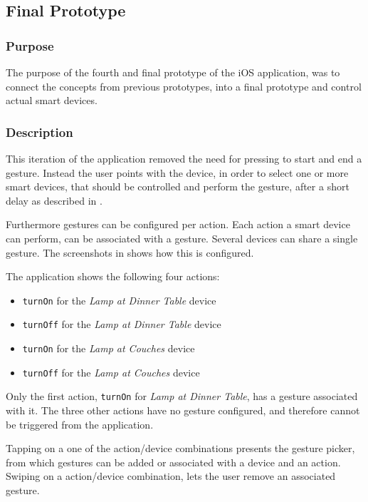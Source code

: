 \subsection{Final Prototype}
\label{sec:implementation:prototypes:prototype4}
\subsubsection{Purpose}
The purpose of the fourth and final prototype of the iOS application, 
was to connect the concepts from previous prototypes, 
into a final prototype and control actual smart devices.

\subsubsection{Description}
This iteration of the application removed the need for pressing to start and end a gesture. 
Instead the user points with the device, 
in order to select one or more smart devices, 
that should be controlled and perform the gesture, 
after a short delay as described in .

Furthermore gestures can be configured per action. 
Each action a smart device can perform, 
can be associated with a gesture. 
Several devices can share a single gesture. 
The screenshots in  shows how this is configured.

The application shows the following four actions:
\begin{itemize}
\item \texttt{turnOn} for the \emph{Lamp at Dinner Table} device
\item \texttt{turnOff} for the \emph{Lamp at Dinner Table} device
\item \texttt{turnOn} for the \emph{Lamp at Couches} device
\item \texttt{turnOff} for the \emph{Lamp at Couches} device
\end{itemize}

Only the first action, 
\texttt{turnOn} for \emph{Lamp at Dinner Table}, 
has a gesture associated with it. 
The three other actions have no gesture configured, 
and therefore cannot be triggered from the application.

Tapping on a one of the action/device combinations presents the gesture picker, 
from which gestures can be added or associated with a device and an action. 
Swiping on a action/device combination, 
lets the user remove an associated gesture.

